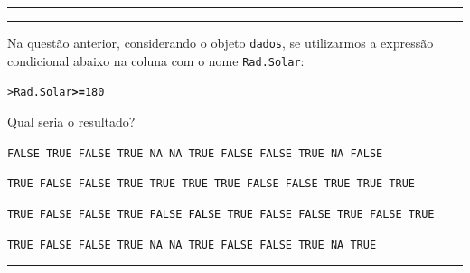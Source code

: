 \documentclass[a4paper,11pt,fleqn]{article}\usepackage[]{graphicx}\usepackage[]{color}
\makeatletter
\newcommand{\hlnum}[1]{\textcolor[rgb]{0,0,0}{#1}}%
\newcommand{\hlopt}[1]{\textcolor[rgb]{0,0,0}{\textbf{#1}}}%
\newcommand{\hlstd}[1]{\textcolor[rgb]{0,0,0}{#1}}%
\newenvironment{kframe}{%
 \def\at@end@of@kframe{}%
 \ifinner\ifhmode%
  \def\at@end@of@kframe{\end{minipage}}%
  \begin{minipage}{\columnwidth}%
 \fi\fi%
 \def\FrameCommand##1{\hskip\@totalleftmargin \hskip-\fboxsep
 \colorbox{shadecolor}{##1}\hskip-\fboxsep
     \hskip-\linewidth \hskip-\@totalleftmargin \hskip\columnwidth}%
 \MakeFramed {\advance\hsize-\width
   \@totalleftmargin\z@ \linewidth\hsize
   \@setminipage}}%
 {\par\unskip\endMakeFramed%
 \at@end@of@kframe}
\newenvironment{knitrout}{}{} %
\theoremstyle{definition}
\makeatother
\begin{document}
\vspace{0.3cm}
\hrule
\vspace{0.3cm}

\newpage

\vspace{0.3cm}
\hrule
\vspace{0.3cm}


\begin{compactenum}[13.]
\item Na questão anterior, considerando o objeto \texttt{dados}, se
  utilizarmos a expressão condicional abaixo na coluna com o nome
  \texttt{Rad.Solar}:
\begin{knitrout}\small
{}\color{fgcolor}\begin{kframe}
\begin{alltt}
\hlstd{> }\hlstd{Rad.Solar} \hlopt{>=} \hlnum{180}
\end{alltt}
\end{kframe}
\end{knitrout}
Qual seria o resultado?
\begin{compactenum}
  \item \texttt{FALSE TRUE FALSE  TRUE    NA    NA  TRUE FALSE FALSE
      TRUE    NA  FALSE}
  \item \texttt{TRUE FALSE FALSE  TRUE    TRUE    TRUE  TRUE FALSE FALSE
      TRUE    TRUE  TRUE}
  \item \texttt{TRUE FALSE FALSE  TRUE    FALSE    FALSE  TRUE FALSE
      FALSE  TRUE    FALSE  TRUE}
  \item \texttt{TRUE FALSE FALSE  TRUE    NA    NA  TRUE FALSE FALSE
      TRUE    NA  TRUE}
\end{compactenum}

\end{compactenum}

\vspace{0.3cm}
\hrule
\vspace{0.3cm}
\end{document}
